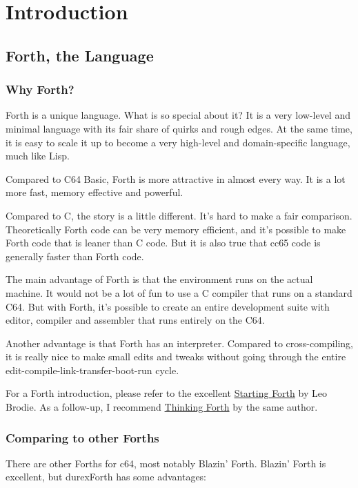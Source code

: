 \chapter{Introduction}

\section{Forth, the Language}

\subsection{Why Forth?}

Forth is a unique language. What is so special about it? It is a very low-level and minimal language with its fair share of quirks and rough edges. At the same time, it is easy to scale it up to become a very high-level and domain-specific language, much like Lisp. 

Compared to C64 Basic, Forth is more attractive in almost every way. It is a lot more fast, memory effective and powerful.

Compared to C, the story is a little different. It's hard to make a fair comparison. Theoretically Forth code can be very memory efficient, and it's possible to make Forth code that is leaner than C code. But it is also true that cc65 code is generally faster than Forth code.

The main advantage of Forth is that the environment runs on the actual machine. It would not be a lot of fun to use a C compiler that runs on a standard C64. But with Forth, it's possible to create an entire development suite with editor, compiler and assembler that runs entirely on the C64.

Another advantage is that Forth has an interpreter. Compared to cross-compiling, it is really nice to make small edits and tweaks without going through the entire edit-compile-link-transfer-boot-run cycle.

For a Forth introduction, please refer to the excellent
\href{http://www.forth.com/starting-forth/}{Starting Forth} by Leo Brodie. As a follow-up, I
recommend \href{http://thinking-forth.sourceforge.net/}{Thinking Forth} by the same author.

\subsection{Comparing to other Forths}

There are other Forths for c64, most notably Blazin' Forth. Blazin' Forth is excellent, but durexForth has some advantages:

